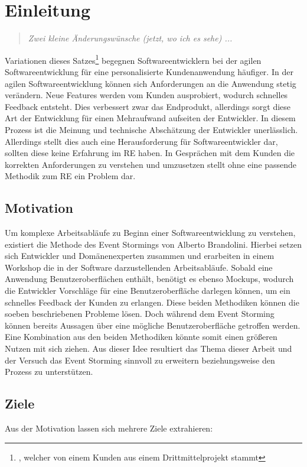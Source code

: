 \chapter{Einleitung}\label{ch:einleitung}

\begin{quote}
    \textit{Zwei kleine Änderungswünsche (jetzt, wo ich es sehe) ...}
\end{quote}


Variationen dieses Satzes\footnote{, welcher von einem Kunden aus einem Drittmittelprojekt stammt}
begegnen Softwareentwicklern bei der agilen Softwareentwicklung für eine personalisierte Kundenanwendung häufiger.
In der agilen Softwareentwicklung können sich Anforderungen an die Anwendung stetig verändern.
Neue Features werden vom Kunden ausprobiert, wodurch schnelles Feedback entsteht.
Dies verbessert zwar das Endprodukt, allerdings sorgt diese Art der Entwicklung für einen Mehraufwand aufseiten der Entwickler.
In diesem Prozess ist die Meinung und technische Abschätzung der Entwickler unerlässlich.
Allerdings stellt dies auch eine Herausforderung für Softwareentwickler dar, sollten diese keine Erfahrung im
\ac{RE} haben.
In Gesprächen mit dem Kunden die korrekten Anforderungen zu verstehen und umzusetzen stellt ohne eine passende Methodik zum
\ac{RE} ein Problem dar.

\section{Motivation}\label{sec:motivation}
Um komplexe Arbeitsabläufe zu Beginn einer Softwareentwicklung zu verstehen, existiert die Methode des Event Stormings von Alberto Brandolini.
Hierbei setzen sich Entwickler und Domänenexperten zusammen und erarbeiten in einem Workshop die in der Software darzustellenden Arbeitsabläufe.
Sobald eine Anwendung Benutzeroberflächen enthält, benötigt es ebenso Mockups, wodurch die Entwickler Vorschläge für eine Benutzeroberfläche
darlegen können, um ein schnelles Feedback der Kunden zu erlangen.
Diese beiden Methodiken können die soeben beschriebenen Probleme lösen.
Doch während dem Event Storming können bereits Aussagen über eine mögliche Benutzeroberfläche getroffen werden.
Eine Kombination aus den beiden Methodiken könnte somit einen größeren Nutzen mit sich ziehen.
Aus dieser Idee resultiert das Thema dieser Arbeit und der Versuch das Event Storming sinnvoll zu erweitern beziehungsweise den Prozess zu unterstützen.

\section{Ziele}\label{sec:ziele}
Aus der Motivation lassen sich mehrere Ziele extrahieren:

